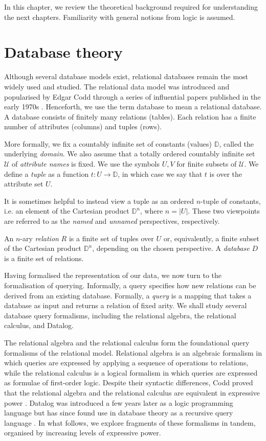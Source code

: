 \documentclass[oneside, 11pt]{amsbook}
\theoremstyle{plain}
\theoremstyle{definition}
\theoremstyle{remark}
\begin{document}
In this chapter, we review the theoretical background required for understanding the next chapters. Familiarity with general notions from logic is assumed.

\section{Database theory}

Although several database models exist, relational databases remain the most widely used and studied. The relational data model was introduced and popularised by Edgar Codd through a series of influential papers published in the early 1970s \cite{Codd1970, Codd1971, Codd1972}. Henceforth, we use the term database to mean a relational database. A database consists of finitely many relations (tables). Each relation has a finite number of attributes (columns) and tuples (rows).

More formally, we fix a countably infinite set of constants (values) $\mathbb{D}$, called the underlying \emph{domain}. We also assume that a totally ordered countably infinite set $\mathcal{U}$ of \emph{attribute names} is fixed. We use the symbols $U,V$ for finite subsets of $\mathcal{U}$. We define a \emph{tuple} as a function $t : U \to \mathbb{D}$, in which case we say that $t$ is over the attribute set $U$.

It is sometimes helpful to instead view a tuple as an ordered $n$-tuple of constants, i.e. an element of the Cartesian product $\mathbb{D}^n$, where $n = |U|$. These two viewpoints are referred to as the \emph{named} and \emph{unnamed} perspectives, respectively.

\begin{defn}[Relation]
    An $n$-ary \emph{relation} $R$ is a finite set of tuples over $U$ or, equivalently, a finite subset of the Cartesian product $\mathbb{D}^n$, depending on the chosen perspective. A \emph{database} $D$ is a finite set of relations.
\end{defn}

Having formalised the representation of our data, we now turn to the formalisation of querying. Informally, a query specifies how new relations can be derived from an existing database. Formally, a \emph{query} is a mapping that takes a database as input and returns a relation of fixed arity. We shall study several database query formalisms, including the relational algebra, the relational calculus, and Datalog.

The relational algebra and the relational calculus form the foundational query formalisms of the relational model. Relational algebra is an algebraic formalism in which queries are expressed by applying a sequence of operations to relations, while the relational calculus is a logical formalism in which queries are expressed as formulae of first-order logic. Despite their syntactic differences, Codd proved that the relational algebra and the relational calculus are equivalent in expressive power \cite{Codd1972}. Datalog was introduced a few years later as a logic programming language but has since found use in database theory as a recursive query language \cite{Chandra1985}. In what follows, we explore fragments of these formalisms in tandem, organised by increasing levels of expressive power.
\end{document}
